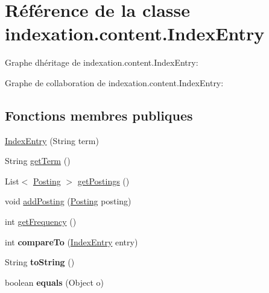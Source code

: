 \hypertarget{classindexation_1_1content_1_1IndexEntry}{}\section{Référence de la classe indexation.\+content.\+Index\+Entry}
\label{classindexation_1_1content_1_1IndexEntry}


Graphe d\textquotesingle{}héritage de indexation.\+content.\+Index\+Entry\+:


Graphe de collaboration de indexation.\+content.\+Index\+Entry\+:
\subsection*{Fonctions membres publiques}
\begin{DoxyCompactItemize}
\item 
\hyperlink{classindexation_1_1content_1_1IndexEntry_ae3c75a7b7264b700a79865a3faa530d1}{Index\+Entry} (String term)
\item 
String \hyperlink{classindexation_1_1content_1_1IndexEntry_aeeaadb85fdb94031de944c67bb80ed2d}{get\+Term} ()
\item 
List$<$ \hyperlink{classindexation_1_1content_1_1Posting}{Posting} $>$ \hyperlink{classindexation_1_1content_1_1IndexEntry_abb6f82fd284de007234cbfb5c3c1ec13}{get\+Postings} ()
\item 
void \hyperlink{classindexation_1_1content_1_1IndexEntry_a91dd96b253668c16155fa48e8a040eed}{add\+Posting} (\hyperlink{classindexation_1_1content_1_1Posting}{Posting} posting)
\item 
int \hyperlink{classindexation_1_1content_1_1IndexEntry_a238cb00163e65a41cf34229ea11d1c15}{get\+Frequency} ()
\item 
\mbox{\label{classindexation_1_1content_1_1IndexEntry_a2c12b8fcca4fc49490e6c86b0895ed34}} 
int {\bfseries compare\+To} (\hyperlink{classindexation_1_1content_1_1IndexEntry}{Index\+Entry} entry)
\item 
\mbox{\label{classindexation_1_1content_1_1IndexEntry_a7513699d767faf46a6ba91d1d3a53173}} 
String {\bfseries to\+String} ()
\item 
\mbox{\label{classindexation_1_1content_1_1IndexEntry_af14cdff0c449996069e03706da82171c}} 
boolean {\bfseries equals} (Object o)
\end{DoxyCompactItemize}
